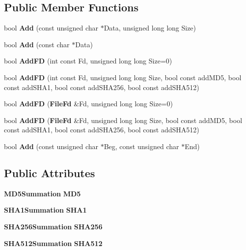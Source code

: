 \subsection*{\-Public \-Member \-Functions}
\begin{DoxyCompactItemize}
\item 
bool {\bfseries \-Add} (const unsigned char $\ast$\-Data, unsigned long long \-Size)\label{classHashes_abba05c140bd3ff1ebb816ca2f20cee3f}

\item 
bool {\bfseries \-Add} (const char $\ast$\-Data)\label{classHashes_a1e4b5c70e06447e00192b0dff87d140e}

\item 
bool {\bfseries \-Add\-F\-D} (int const \-Fd, unsigned long long \-Size=0)\label{classHashes_afd9329e3532ff31e987edacf072111c2}

\item 
bool {\bfseries \-Add\-F\-D} (int const \-Fd, unsigned long long \-Size, bool const add\-M\-D5, bool const add\-S\-H\-A1, bool const add\-S\-H\-A256, bool const add\-S\-H\-A512)\label{classHashes_a4e87643ce9b38cce3d9ba7138dc339da}

\item 
bool {\bfseries \-Add\-F\-D} ({\bf \-File\-Fd} \&\-Fd, unsigned long long \-Size=0)\label{classHashes_a0d9064bf552f940c29d1ebda2468accb}

\item 
bool {\bfseries \-Add\-F\-D} ({\bf \-File\-Fd} \&\-Fd, unsigned long long \-Size, bool const add\-M\-D5, bool const add\-S\-H\-A1, bool const add\-S\-H\-A256, bool const add\-S\-H\-A512)\label{classHashes_a80e274e84d2b80b2f307847d2b15f52c}

\item 
bool {\bfseries \-Add} (const unsigned char $\ast$\-Beg, const unsigned char $\ast$\-End)\label{classHashes_a44d261f1d8091538cddf01568be612a7}

\end{DoxyCompactItemize}
\subsection*{\-Public \-Attributes}
\begin{DoxyCompactItemize}
\item 
{\bf \-M\-D5\-Summation} {\bfseries \-M\-D5}\label{classHashes_aca8747d6e469f8ba58488d35286a72b1}

\item 
{\bf \-S\-H\-A1\-Summation} {\bfseries \-S\-H\-A1}\label{classHashes_ad97846b0d83f3389af011bd636420d39}

\item 
{\bf \-S\-H\-A256\-Summation} {\bfseries \-S\-H\-A256}\label{classHashes_a79bdb70d0730f723fb6299b0bb60a79c}

\item 
{\bf \-S\-H\-A512\-Summation} {\bfseries \-S\-H\-A512}\label{classHashes_accf3573b64d453e2728805a2849ca75a}

\end{DoxyCompactItemize}


